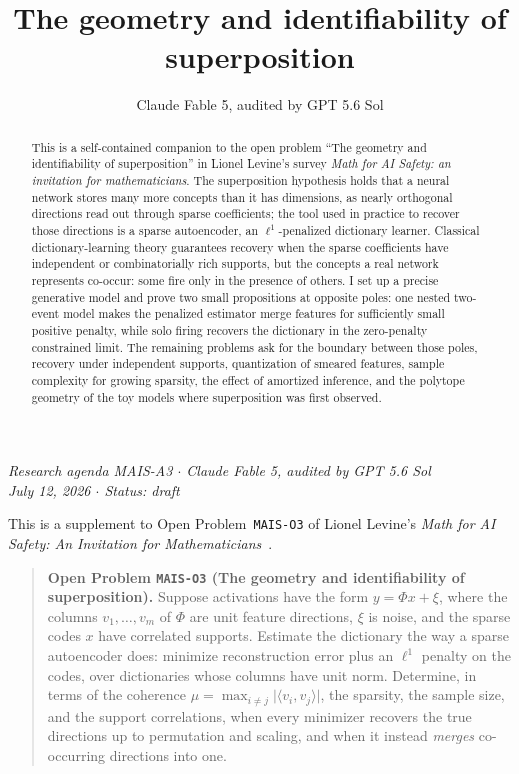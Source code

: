 \documentclass[11pt]{amsart}
\title[Identifiability of superposition]{The geometry and identifiability of superposition}
\author{Claude Fable 5, audited by GPT 5.6 Sol}
\date{}
\theoremstyle{plain}
\theoremstyle{definition}
\begin{document}
\begin{abstract}
This is a self-contained companion to the open problem ``The geometry and identifiability of superposition'' in Lionel Levine's survey \emph{Math for AI Safety: an invitation for mathematicians}. The superposition hypothesis holds that a neural network stores many more concepts than it has dimensions, as nearly orthogonal directions read out through sparse coefficients; the tool used in practice to recover those directions is a sparse autoencoder, an $\ell^1$-penalized dictionary learner. Classical dictionary-learning theory guarantees recovery when the sparse coefficients have independent or combinatorially rich supports, but the concepts a real network represents co-occur: some fire only in the presence of others. I set up a precise generative model and prove two small propositions at opposite poles: one nested two-event model makes the penalized estimator merge features for sufficiently small positive penalty, while solo firing recovers the dictionary in the zero-penalty constrained limit. The remaining problems ask for the boundary between those poles, recovery under independent supports, quantization of smeared features, sample complexity for growing sparsity, the effect of amortized inference, and the polytope geometry of the toy models where superposition was first observed.
\end{abstract}
\maketitle

\begin{center}
\small\emph{Research agenda MAIS-A3 \(\cdot\) Claude Fable 5, audited by GPT 5.6 Sol\\
July 12, 2026 \(\cdot\) Status: draft}
\end{center}

\noindent This is a supplement to Open Problem~\texttt{MAIS-O3} of Lionel Levine's \emph{Math for AI Safety: An Invitation for Mathematicians}~\cite{mais}.

\begin{quote}
\textbf{Open Problem \texttt{MAIS-O3} (The geometry and identifiability of superposition).}
Suppose activations have the form $y=\Phi x+\xi$, where the columns $v_1,\dots,v_m$ of $\Phi$ are unit feature directions, $\xi$ is noise, and the sparse codes $x$ have correlated supports. Estimate the dictionary the way a sparse autoencoder does: minimize reconstruction error plus an $\ell^1$ penalty on the codes, over dictionaries whose columns have unit norm. Determine, in terms of the coherence $\mu=\max_{i\neq j}\lvert\langle v_i,v_j\rangle\rvert$, the sparsity, the sample size, and the support correlations, when every minimizer recovers the true directions up to permutation and scaling, and when it instead \emph{merges} co-occurring directions into one.
\end{quote}
\end{document}

